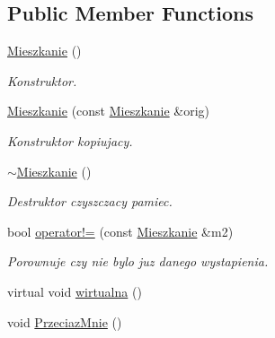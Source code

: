 \subsection*{Public Member Functions}
\begin{DoxyCompactItemize}
\item 
\hyperlink{class_mieszkanie_a2c48251c70dd72049d77bdfa9f506355}{Mieszkanie} ()\hypertarget{class_mieszkanie_a2c48251c70dd72049d77bdfa9f506355}{}\label{class_mieszkanie_a2c48251c70dd72049d77bdfa9f506355}

\begin{DoxyCompactList}\small\item\em Konstruktor. \end{DoxyCompactList}\item 
\hyperlink{class_mieszkanie_ad42e3ad03375cec028c743febdb939d9}{Mieszkanie} (const \hyperlink{class_mieszkanie}{Mieszkanie} \&orig)\hypertarget{class_mieszkanie_ad42e3ad03375cec028c743febdb939d9}{}\label{class_mieszkanie_ad42e3ad03375cec028c743febdb939d9}

\begin{DoxyCompactList}\small\item\em Konstruktor kopiujacy. \end{DoxyCompactList}\item 
\hyperlink{class_mieszkanie_af324f74a786489b6850d7130200420de}{$\sim$\+Mieszkanie} ()\hypertarget{class_mieszkanie_af324f74a786489b6850d7130200420de}{}\label{class_mieszkanie_af324f74a786489b6850d7130200420de}

\begin{DoxyCompactList}\small\item\em Destruktor czyszczacy pamiec. \end{DoxyCompactList}\item 
bool \hyperlink{class_mieszkanie_ac328e12cf91e82575b9df90761eda765}{operator!=} (const \hyperlink{class_mieszkanie}{Mieszkanie} \&m2)
\begin{DoxyCompactList}\small\item\em Porownuje czy nie bylo juz danego wystapienia. \end{DoxyCompactList}\item 
virtual void \hyperlink{class_mieszkanie_ae4d42bcda6f9d88dd22fdc5e8d6f3072}{wirtualna} ()
\item 
void \hyperlink{class_mieszkanie_a0e2991b16dbe087b360747e20772e2a3}{Przeciaz\+Mnie} ()
\end{DoxyCompactItemize}
